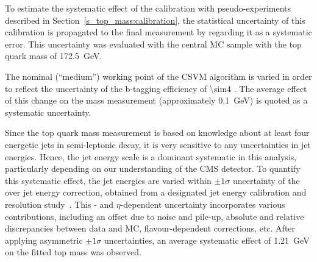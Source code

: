 


\begin{description}[wide=\parindent]
\item [Fit calibration statistics.] To estimate the systematic effect of the calibration with pseudo-experiments
described in Section~\ref{s_top_mass:calibration}, the statistical uncertainty of this calibration is propagated to the
final measurement by regarding it as a systematic error. This uncertainty was evaluated with the central \ttbar MC
sample with the top quark mass of \SI{172.5}{\GeV}.

\item [b-tagging.] The nominal (``medium'') working point of the CSVM algorithm is varied in order to reflect the
uncertainty of the b-tagging efficiency of \SI{\sim4}{\pc} \autocite{b-tagging_CMS}. The average effect of this change
on the mass measurement (approximately \SI{0.1}{\GeV}) is quoted as a systematic uncertainty.

\item [Jet energy scale.] Since the top quark mass measurement is based on knowledge about at least four energetic jets
in semi-leptonic \ttbar decay, it is very sensitive to any uncertainties in jet energies. Hence, the jet energy scale is
a dominant systematic in this analysis, particularly depending on our understanding of the CMS detector. To quantify
this systematic effect, the jet energies are varied within $\pm1\sigma$ uncertainty of the over jet energy correction,
obtained from a designated jet energy calibration and resolution study~\autocite{JEC_7TeV}. This \pt- and
$\eta$-dependent uncertainty incorporates various contributions, including an offset due to noise and pile-up, absolute
and relative discrepancies between data and MC, flavour-dependent corrections, etc. After applying asymmetric
$\pm1\sigma$ uncertainties, an average systematic effect of \SI{1.21}{\GeV} on the fitted top mass was observed.



\end{description}

